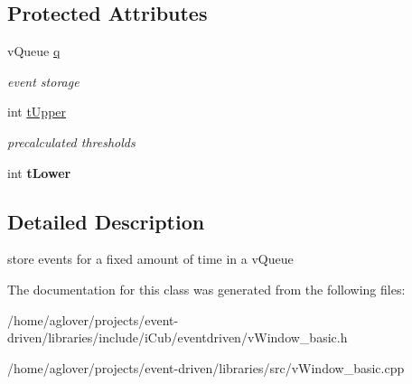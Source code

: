 \subsection*{Protected Attributes}
\begin{DoxyCompactItemize}
\item 
v\+Queue \hyperlink{classev_1_1vTempWindow_abed022ad51f68443a2350fbeabbb4233}{q}\hypertarget{classev_1_1vTempWindow_abed022ad51f68443a2350fbeabbb4233}{}\label{classev_1_1vTempWindow_abed022ad51f68443a2350fbeabbb4233}

\begin{DoxyCompactList}\small\item\em event storage \end{DoxyCompactList}\item 
int \hyperlink{classev_1_1vTempWindow_a909a8f6df0014d1f318c6209223f5fad}{t\+Upper}\hypertarget{classev_1_1vTempWindow_a909a8f6df0014d1f318c6209223f5fad}{}\label{classev_1_1vTempWindow_a909a8f6df0014d1f318c6209223f5fad}

\begin{DoxyCompactList}\small\item\em precalculated thresholds \end{DoxyCompactList}\item 
int {\bfseries t\+Lower}\hypertarget{classev_1_1vTempWindow_a47845a9e47b73598e2a325c06e994bed}{}\label{classev_1_1vTempWindow_a47845a9e47b73598e2a325c06e994bed}

\end{DoxyCompactItemize}


\subsection{Detailed Description}
store events for a fixed amount of time in a v\+Queue 

The documentation for this class was generated from the following files\+:\begin{DoxyCompactItemize}
\item 
/home/aglover/projects/event-\/driven/libraries/include/i\+Cub/eventdriven/v\+Window\+\_\+basic.\+h\item 
/home/aglover/projects/event-\/driven/libraries/src/v\+Window\+\_\+basic.\+cpp\end{DoxyCompactItemize}
